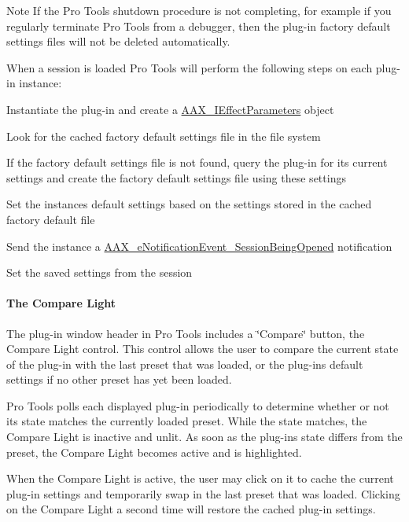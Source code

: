 \begin{DoxyNote}{Note}
If the Pro Tools shutdown procedure is not completing, for example if you regularly terminate Pro Tools from a debugger, then the plug-\/in factory default settings files will not be deleted automatically.
\end{DoxyNote}
When a session is loaded Pro Tools will perform the following steps on each plug-\/in instance\+: 
\begin{DoxyEnumerate}
\item Instantiate the plug-\/in and create a \hyperlink{a00099}{A\+A\+X\+\_\+\+I\+Effect\+Parameters} object  
\item Look for the cached factory default settings file in the file system  
\item If the factory default settings file is not found, query the plug-\/in for its current settings and create the factory default settings file using these settings  
\item Set the instance\textquotesingle{}s default settings based on the settings stored in the cached factory default file  
\item Send the instance a \hyperlink{a00206_afab5ea2cfd731fc8f163b6caa685406ea013a21c2c111bac54b962b40f1b4bc1f}{A\+A\+X\+\_\+e\+Notification\+Event\+\_\+\+Session\+Being\+Opened} notification  
\item Set the saved settings from the session  
\end{DoxyEnumerate}

\hypertarget{a00360_subsubsection__the_compare_light_}{}\paragraph{The Compare Light}\label{a00360_subsubsection__the_compare_light_}
 The plug-\/in window header in Pro Tools includes a \char`\"{}\+Compare\char`\"{} button, the Compare Light control. This control allows the user to compare the current state of the plug-\/in with the last preset that was loaded, or the plug-\/in\textquotesingle{}s default settings if no other preset has yet been loaded.

Pro Tools polls each displayed plug-\/in periodically to determine whether or not its state matches the currently loaded preset. While the state matches, the Compare Light is inactive and unlit. As soon as the plug-\/in\textquotesingle{}s state differs from the preset, the Compare Light becomes active and is highlighted.

When the Compare Light is active, the user may click on it to cache the current plug-\/in settings and temporarily swap in the last preset that was loaded. Clicking on the Compare Light a second time will restore the cached plug-\/in settings.

